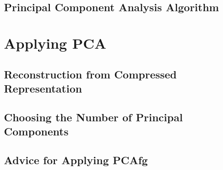 \documentclass{article}
\begin{document}
\begin{CJK}{UTF8}{gbsn}
\subsection{Principal Component Analysis Algorithm}
\section{Applying PCA}
\subsection{Reconstruction from Compressed Representation}
\subsection{Choosing the Number of Principal Components}
\subsection{Advice for Applying PCAfg}
\end{CJK}
\end{document}
